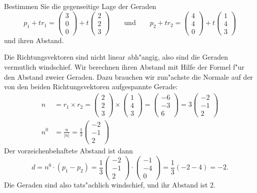 Bestimmen Sie die gegenseitige Lage der Geraden
\[
p_1+tr_1
=
\begin{pmatrix} 3\\ 0\\ 0 \end{pmatrix}
+t
\begin{pmatrix} 2\\ 2\\ 3 \end{pmatrix}
\qquad
\text{und}
\qquad
p_2+tr_2
=
\begin{pmatrix} 4\\ 4\\ 0 \end{pmatrix}
+t
\begin{pmatrix} 1\\ 4\\ 3 \end{pmatrix}
\]
und ihren Abstand.

\begin{loesung}
Die Richtungsvektoren sind nicht linear abh"angig, also sind
die Geraden vermutlich windschief. Wir berechnen ihren Abstand mit
Hilfe der Formel f"ur den Abstand zweier Geraden. Dazu brauchen
wir zun"achste die Normale auf der von den beiden Richtungsvektoren
aufgespannte Gerade:
\begin{align*}
n&=r_1\times r_2 =\begin{pmatrix} 2\\ 2\\ 3 \end{pmatrix}
\times
\begin{pmatrix} 1\\ 4\\ 3 \end{pmatrix}
=
\begin{pmatrix} -6\\-3\\6 \end{pmatrix}
=3
\begin{pmatrix} -2\\-1\\2 \end{pmatrix}
\\
n^0&=\frac{n}{|n|}=
\frac13
\begin{pmatrix} -2\\-1\\2 \end{pmatrix}
\end{align*}
Der vorzeichenbehaftete Abstand ist dann
\[
d=n^0\cdot(p_1-p_2)=
\frac13
\begin{pmatrix} -2\\-1\\2 \end{pmatrix}
\cdot
\begin{pmatrix}-1\\-4\\0\end{pmatrix}
=\frac13(-2-4)=-2.
\]
Die Geraden sind also tats"achlich windschief, und
ihr Abstand ist $2$.
\end{loesung}

